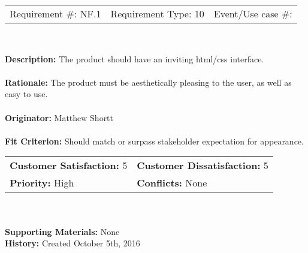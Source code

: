 \documentclass[12pt, titlepage]{article}
\begin{document}
\begin{framed}

	\begin{center}
		
		\begin{tabular}{ l c r }
			Requirement \#: NF.1 & Requirement Type: 10 & Event/Use case \#: \\
		\end{tabular} \\
	\end{center}
	\textbf{Description:} The product should have an inviting html/css interface.\\
	\\
	\textbf{Rationale:} The product must be aesthetically pleasing to the user, as well as 
	easy 
	to use.  \\
	\\
	\textbf{Originator:} Matthew Shortt \\
	\\
	\textbf{Fit Criterion:} Should match or surpass stakeholder expectation for 
	appearance.   
	\\

	\begin{tabular}{ll}
		\textbf{Customer Satisfaction:} 5 & \textbf{Customer Dissatisfaction:} 5 \\
		\textbf{Priority:} High & \textbf{Conflicts:} None\\
	\end{tabular} \\
	\\
	\textbf{Supporting Materials:} None \\
	\textbf{History:} Created October 5th, 2016

\end{framed}
\end{document}
